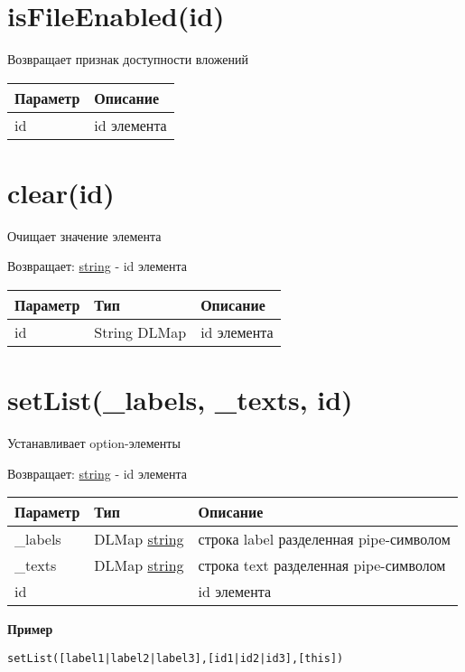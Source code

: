 \hypertarget{isfileenabledid-boolean}{%
\section{isFileEnabled(id)}\label{isfileenabledid-boolean}}

Возвращает признак доступности вложений


\begin{longtable}[]{@{}ll@{}}
\toprule
Параметр & Описание\tabularnewline
\midrule
\endhead
id & id элемента\tabularnewline
\bottomrule
\end{longtable}

\hypertarget{clearid-string}{%
\section{clear(id)}\label{clearid-string}}

Очищает значение элемента

Возвращает: \protect\hyperlink{string}{string} - id элемента

\begin{longtable}[]{@{}lll@{}}
\toprule
Параметр & Тип & Описание\tabularnewline
\midrule
\endhead
id & String \textbar{} DLMap & id элемента\tabularnewline
\bottomrule
\end{longtable}

\hypertarget{setlist}{%
\section{setList(\_labels, \_texts, id)}\label{setlist}}

Устанавливает
option-элементы

Возвращает: \protect\hyperlink{string}{string} - id элемента

\begin{longtable}[]{@{}lll@{}}
\toprule
Параметр & Тип & Описание\tabularnewline
\midrule
\endhead
\_labels & DLMap \textbar{} \protect\hyperlink{string}{string} & строка
label разделенная pipe-символом\tabularnewline
\_texts & DLMap \textbar{} \protect\hyperlink{string}{string} & строка
text разделенная pipe-символом\tabularnewline
id & & id элемента\tabularnewline
\bottomrule
\end{longtable}

\textbf{Пример}

\begin{verbatim}
setList([label1|label2|label3],[id1|id2|id3],[this])
\end{verbatim}

